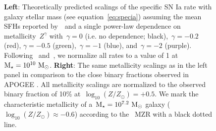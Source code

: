 \documentclass[ms.tex]{subfiles}
\begin{document}
\begin{figure}
\caption{
\textbf{Left}: Theoretically predicted scalings of the specific SN Ia rate with
galaxy stellar mass (see equation~\ref{eq:specia}) assuming the mean SFHs
reported by~\um~and a single power-law dependence on metallicity~$Z^\gamma$
with~$\gamma = 0$ (i.e. no dependence; black),~$\gamma = -0.2$ (red),
$\gamma = -0.5$ (green),~$\gamma = -1$ (blue), and~$\gamma = -2$ (purple).
Following~\citet{Brown2019} and~\citet{Gandhi2022}, we normalize all rates to
a value of 1 at~$\text{M}_\star = 10^{10}~\text{M}_\odot$.
\textbf{Right}: The same metallicity scalings as in the left panel in
comparison to the close binary fractions observed in APOGEE
\citep[][black dashed line with error bars]{Moe2019}.
All metallicity scalings are normalized to the observed binary fraction of 10\%
at~$\log_{10}(Z / Z_\odot) = +0.5$.
We mark the characteristic metallicity of a~$\text{M}_\star = 10^{7.2}~\text{M}_\odot$ galaxy
($\log_{10}(Z / Z_\odot) \approx -0.6$) according to the~\citet{Zahid2014} MZR
with a black dotted line.
}
\label{fig:specia_metdep}
\end{figure}
\end{document}
